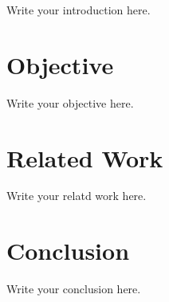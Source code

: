 \begin{spacing}{2.0}

Write your introduction here.

\end{spacing}

\clearpage
{}



\newpage
{}
\chapter{Objective}
\pagestyle{plain}

\begin{spacing}{2.0}

Write your objective here.

\end{spacing}

\clearpage
{}

\newpage
{}
\chapter{Related Work}
\pagestyle{plain}

\begin{spacing}{2.0}

Write your relatd work here.

\end{spacing}

\clearpage
{}

\newpage
{}
\chapter{Conclusion}
\pagestyle{plain}

\begin{spacing}{2.0}

Write your conclusion here.

\end{spacing}

\clearpage
{}

